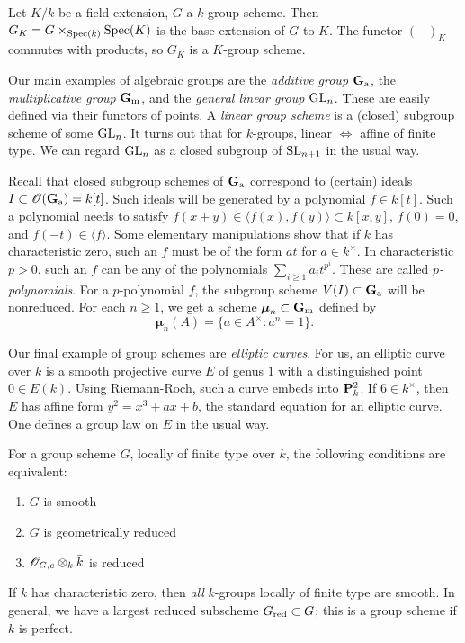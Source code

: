 Let $K/k$ be a field extension, $G$ a $k$-group scheme. Then 
$G_K=G\times_{\operatorname{Spec}(k)} \operatorname{Spec}(K)$ is the base-extension of $G$ to 
$K$. The functor $(-)_K$ commutes with products, so $G_K$ is a $K$-group 
scheme. 

Our main examples of algebraic groups are the \emph{additive group} 
$\mathbf{G}_{\mathrm{a}}$, the \emph{multiplicative group} $\mathbf{G}_{\mathrm{m}}$, and the 
\emph{general linear group} $\operatorname{GL}_n$. These are easily defined 
via their functors of points. A \emph{linear group scheme} is a (closed) 
subgroup scheme of some $\operatorname{GL}_n$. It turns out that for 
$k$-groups, linear $\Leftrightarrow$ affine of finite type. We can regard 
$\operatorname{GL}_n$ as a closed subgroup of $\operatorname{SL}_{n+1}$ in the 
usual way. 

Recall that closed subgroup schemes of $\mathbf{G}_{\mathrm{a}}$ correspond to 
(certain) 
ideals $I\subset \mathscr{O}(\mathbf{G}_{\mathrm{a}}) = k[t]$. Such ideals will be 
generated by a polynomial $f\in k[t]$. Such a polynomial needs to 
satisfy $f(x+y) \in \langle f(x),f(y)\rangle \subset k[x,y]$, 
$f(0)=0$, and $f(-t) \in \langle f\rangle$. Some elementary manipulations 
show that if $k$ has characteristic zero, such an $f$ must be of the 
form $a t$ for $a\in k^\times$. In characteristic $p>0$, such an $f$ can 
be any of the polynomials $\sum_{i\geqslant 1} a_i t^{p^i}$. These are 
called \emph{$p$-polynomials}. For a $p$-polynomial $f$, the subgroup 
scheme $V(I)\subset \mathbf{G}_{\mathrm{a}}$ will be nonreduced. For each 
$n\geqslant 1$, we get a scheme $\boldsymbol\mu_n\subset \mathbf{G}_{\mathrm{m}}$ defined 
by 
\[
  \boldsymbol\mu_n(A) = \{a\in A^\times:a^n=1\} .
\]

Our final example of group schemes are \emph{elliptic curves}. For us, 
an elliptic curve over $k$ is a smooth projective curve $E$ of genus $1$ 
with a distinguished point $0\in E(k)$. Using Riemann-Roch, such a curve 
embeds into $\mathbf{P}_k^2$. If $6\in k^\times$, then 
$E$ has affine form $y^2=x^3+a x+b$, the standard equation for an elliptic 
curve. One defines a group law on $E$ in the usual way. 

For a group scheme $G$, locally of finite type over $k$, the following 
conditions are equivalent:
\begin{enumerate}
  \item $G$ is smooth
  \item $G$ is geometrically reduced
  \item $\mathscr{O}_{G,e}\otimes_k \bar k$ is reduced
\end{enumerate}
If $k$ has characteristic zero, then \emph{all} $k$-groups locally of 
finite type are smooth. In general, we have a largest reduced 
subscheme $G_{\mathrm{red}}\subset G$; this is a group scheme if $k$ is 
perfect. 





